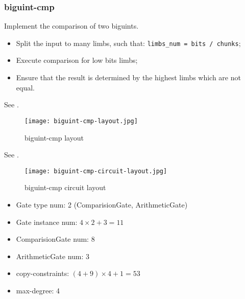 \subsubsection{biguint-cmp}

Implement the comparison of two biguints.

\begin{itemize}
    \item Split the input to many limbs, such that: \verb|limbs_num = bits / chunks|;
    \item Execute comparison for low bits limbs;
    \item Ensure that the result is determined by the highest limbs which are not equal.
\end{itemize}

See .
\begin{figure}[!ht]
    \centering
    \texttt{[image: biguint-cmp-layout.jpg]}
    \caption{biguint-cmp layout}
    \label{fig:biguint-cmp-layout}
\end{figure}

See .
\begin{figure}[!ht]
    \centering
    \texttt{[image: biguint-cmp-circuit-layout.jpg]}
    \caption{biguint-cmp circuit layout}
    \label{fig:biguint-cmp-circuit-layout}
\end{figure}

\begin{itemize}
    \item Gate type num: 2 (ComparisionGate, ArithmeticGate)
    \item Gate instance num: $4 \times 2 + 3 = 11$
    \item ComparisionGate num: 8
    \item ArithmeticGate num: 3
    \item copy-constraints: $(4 + 9) \times 4 + 1 = 53$
    \item max-degree: 4
\end{itemize}
